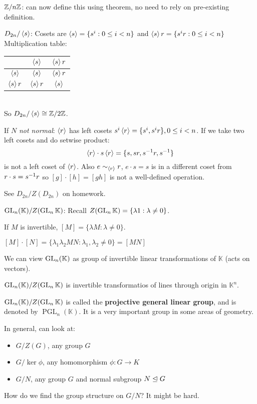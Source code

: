 \begin{ex}
$\mathbb Z/n\mathbb Z$: can now define this using theorem, no need to rely on pre-existing definition.

$D_{2n}/\left\langle s \right\rangle$: Cosets are $\left\langle s \right\rangle= \{s^i:0\le i < n\}$ and $\left\langle s \right\rangle r = \{s^ir:0\le i<n\}$
\\
Multiplication table: \begin{tabular}{c|cc}
	& $\left\langle s \right\rangle$ & $\left\langle s \right\rangle r$\\\hline 
$\left\langle s \right\rangle$ & $\left\langle s \right\rangle$ & $\left\langle s \right\rangle r$\\
$\left\langle s \right\rangle r$ & $\left\langle s \right\rangle r$ & $\left\langle s \right\rangle$
\end{tabular}\\
So $D_{2n}/\left\langle s \right\rangle\cong \mathbb Z/{2}\mathbb Z$.

If $N$ \textit{not normal}: $\left\langle r \right\rangle$ has left cosets $s^i \left\langle r \right\rangle = \{s^i,s^ir\}, 0\le i < n$. If we take two left cosets and do setwise product:
$$\left\langle r \right\rangle\cdot s\left\langle r \right\rangle = \{s,sr,s^{-1} r, s^{-1}\}$$
is not a left coset of $\left\langle r \right\rangle$. Also $e\sim_{\left\langle r \right\rangle}r$, $e\cdot s=s$ is in a different coset from $r\cdot s=s^{-1} r$ so $[g]\cdot [h]=[gh]$ is not a well-defined operation.

See $D_{2n}/Z(D_{2n})$ on homework.
\end{ex}

\begin{ex}
$\operatorname{GL}_n(\mathbb{K})/Z(\operatorname{GL}_n \mathbb{K})$: Recall $Z(\operatorname{GL}_n\mathbb{K})= \{\lambda1: \lambda\ne 0\}$.

If $M$ is invertible, $[M]=\{\lambda M: \lambda\ne 0\}$.

$[M]\cdot [N] = \{\lambda_1\lambda_2 MN: \lambda_1, \lambda_2 \ne 0\} = [MN]$

We can view $\operatorname{GL}_n(\mathbb{K})$ as group of invertible linear transformations of $\mathbb{K}$ (acts on vectors).

$\operatorname{GL}_n(\mathbb{K})/Z(\operatorname{GL}_n \mathbb{K})$ is invertible transformatios of lines through origin in $\mathbb{K}^n$.

$\operatorname{GL}_n(\mathbb{K})/Z(\operatorname{GL}_n\mathbb{K})$ is called the \textbf{projective general linear group}, and is denoted by $\operatorname{PGL}_n(\mathbb{K})$. It is a very important group in some areas of geometry.
\end{ex}

In general, can look at: 
\begin{itemize}
\item $G/Z(G)$, any group $G$
\item $G/\ker \phi$, any homomorphism $\phi:G\to K$
\item $G/N$, any group $G$ and normal subgroup $N\trianglelefteq G$
\end{itemize}
How do we find the group structure on $G/N$? It might be hard.

